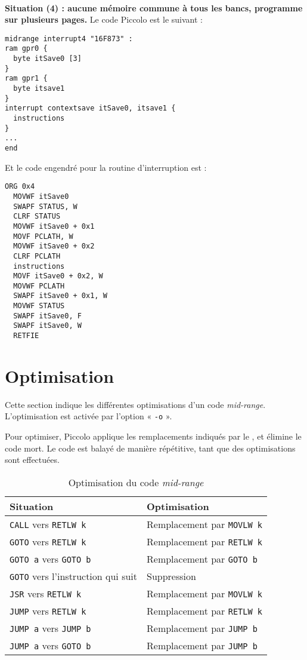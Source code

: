 ~\\
\textbf{Situation (4) : aucune mémoire commune à tous les bancs, programme sur plusieurs pages.} Le code Piccolo est le suivant :
\begin{lstlisting}[language=piccolo]
midrange interrupt4 "16F873" :
ram gpr0 {
  byte itSave0 [3]
}
ram gpr1 {
  byte itsave1
}
interrupt contextsave itSave0, itsave1 {
  instructions
}
...
end
\end{lstlisting}

Et le code engendré pour la routine d'interruption est :
\begin{lstlisting}[language=assembleur]
  ORG 0x4
  MOVWF itSave0
  SWAPF STATUS, W
  CLRF STATUS
  MOVWF itSave0 + 0x1
  MOVF PCLATH, W
  MOVWF itSave0 + 0x2
  CLRF PCLATH
  instructions
  MOVF itSave0 + 0x2, W
  MOVWF PCLATH
  SWAPF itSave0 + 0x1, W
  MOVWF STATUS
  SWAPF itSave0, F
  SWAPF itSave0, W
  RETFIE\end{lstlisting}








\section{Optimisation}

Cette section indique les différentes optimisations d'un code \emph{mid-range}. L'optimisation est activée par l'option « \texttt{-o} ».

Pour optimiser, Piccolo applique les remplacements indiqués par le , et élimine le code mort. Le code est balayé de manière répétitive, tant que des optimisations sont effectuées.

\begin{table}[!ht]
  \centering
  \small
  \begin{tabular}{ll}
    \textbf{Situation} & \textbf{Optimisation} \\
    \hline
    \texttt{CALL} vers \texttt{RETLW k}  & Remplacement par \texttt{MOVLW k}\\
    \texttt{GOTO} vers \texttt{RETLW k}  & Remplacement par \texttt{RETLW k}\\
    \texttt{GOTO a} vers \texttt{GOTO b}  & Remplacement par \texttt{GOTO b}\\
    \texttt{GOTO} vers l'instruction qui suit  & Suppression\\
    \texttt{JSR} vers \texttt{RETLW k}  & Remplacement par \texttt{MOVLW k}\\
    \texttt{JUMP} vers \texttt{RETLW k}  & Remplacement par \texttt{RETLW k}\\
    \texttt{JUMP a} vers \texttt{JUMP b}  & Remplacement par \texttt{JUMP b}\\
    \texttt{JUMP a} vers \texttt{GOTO b}  & Remplacement par \texttt{JUMP b}\\
    \hline
  \end{tabular}
  \caption{Optimisation du code \emph{mid-range}}
\end{table}




